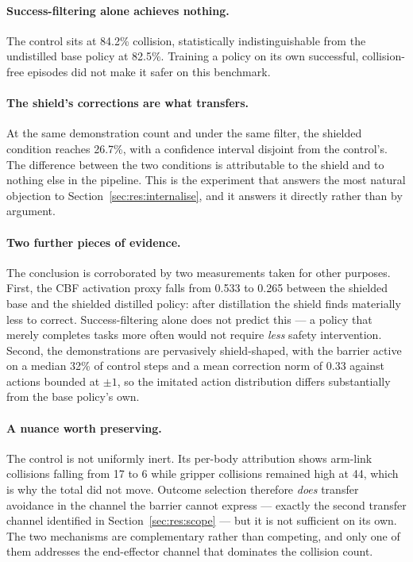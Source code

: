 \documentclass[a4paper,11pt]{report}
\begin{document}
\paragraph{Success-filtering alone achieves nothing.}
The control sits at 84.2\% collision, statistically indistinguishable from the undistilled base
policy at 82.5\%. Training a policy on its own successful, collision-free episodes did not make it
safer on this benchmark.

\paragraph{The shield's corrections are what transfers.}
At the same demonstration count and under the same filter, the shielded condition reaches 26.7\%,
with a confidence interval disjoint from the control's. The difference between the two conditions
is attributable to the shield and to nothing else in the pipeline. This is the experiment that
answers the most natural objection to Section~\ref{sec:res:internalise}, and it answers it directly
rather than by argument.

\paragraph{Two further pieces of evidence.}
The conclusion is corroborated by two measurements taken for other purposes. First, the CBF
activation proxy falls from 0.533 to 0.265 between the shielded base and the shielded distilled
policy: after distillation the shield finds materially less to correct. Success-filtering alone
does not predict this --- a policy that merely completes tasks more often would not require
\emph{less} safety intervention. Second, the demonstrations are pervasively shield-shaped, with the
barrier active on a median 32\% of control steps and a mean correction norm of 0.33 against actions
bounded at $\pm 1$, so the imitated action distribution differs substantially from the base
policy's own.

\paragraph{A nuance worth preserving.}
The control is not uniformly inert. Its per-body attribution shows arm-link collisions falling from
17 to 6 while gripper collisions remained high at 44, which is why the total did not move. Outcome
selection therefore \emph{does} transfer avoidance in the channel the barrier cannot express ---
exactly the second transfer channel identified in Section~\ref{sec:res:scope} --- but it is not
sufficient on its own. The two mechanisms are complementary rather than competing, and only one of
them addresses the end-effector channel that dominates the collision count.
\end{document}
